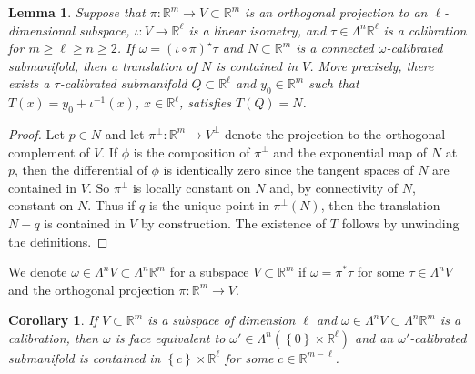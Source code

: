 \documentclass[a4paper,leqno,11pt]{amsart}
\numberwithin{equation}{section}
\newtheorem{corollary}[theorem]{Corollary}
\newtheorem{lemma}[theorem]{Lemma}
\theoremstyle{remark}
\theoremstyle{remark}
\newcommand{\R}{\mathbb{R}}
\begin{document}
\begin{lemma}\label{lemm:affinetranslation}
Suppose that $\pi \colon \R^m \to V \subset \R^m$ is an orthogonal projection to an $\ell$-dimensional subspace, $\iota \colon V \to \mathbb{R}^{\ell}$ is a linear isometry, and $\tau \in \Lambda^n \mathbb{R}^{\ell}$ is a calibration for $m \geq \ell \geq n \geq 2$. If $\omega = ( \iota \circ \pi )^{\star}\tau$ and $N \subset \R^m$ is a connected $\omega$-calibrated submanifold, then a translation of $N$ is contained in $V$. More precisely, there exists a $\tau$-calibrated submanifold $Q \subset \R^{\ell}$ and $y_0 \in \R^m$ such that $T(x) = y_0 + \iota^{-1}(x)$, $x \in \mathbb{R}^{\ell}$, satisfies $T(Q) = N$.
\end{lemma}
\begin{proof}
Let $p \in N$ and let $\pi^{\perp} \colon \mathbb{R}^m \to V^{\perp}$ denote the projection to the orthogonal complement of $V$. If $\phi$ is the composition of $\pi^{\perp}$ and the exponential map of $N$ at $p$, then the differential of $\phi$ is identically zero since the tangent spaces of $N$ are contained in $V$. So $\pi^{\perp}$ is locally constant on $N$ and, by connectivity of $N$, constant on $N$. Thus if $q$ is the unique point in $\pi^{\perp}( N )$, then the translation $N - q$ is contained in $V$ by construction. The existence of $T$ follows by unwinding the definitions.
\end{proof}
We denote $\omega \in \Lambda^n V \subset \Lambda^n \R^m$ for a subspace $V \subset \R^m$ if $\omega = \pi^{*}\tau$ for some $\tau \in \Lambda^n V$ and the orthogonal projection $\pi \colon \R^m \to V$.
\begin{corollary}\label{cor:faceequivalence}
If $V \subset \R^m$ is a subspace of dimension $\ell$ and $\omega \in \Lambda^n V \subset \Lambda^n \R^m$ is a calibration, then $\omega$ is face equivalent to $\omega' \in \Lambda^n\left( \left\{0\right\} \times \mathbb{R}^{\ell} \right)$ and an $\omega'$-calibrated submanifold is contained in $\left\{ c \right\} \times \mathbb{R}^{\ell}$ for some $c \in \R^{m-\ell}$.
\end{corollary}
\end{document}
